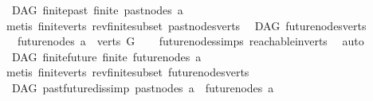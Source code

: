 \begin{isabellebody}
\isanewline
%
\endisadelimproof
\isanewline
{}\isamarkupfalse%
\ {\isacharparenleft}{\kern0pt}\ DAG{\isacharparenright}{\kern0pt}\ finite{\isacharunderscore}{\kern0pt}past{\isacharcolon}{\kern0pt}\ {\isachardoublequoteopen}finite\ {\isacharparenleft}{\kern0pt}past{\isacharunderscore}{\kern0pt}nodes\ a{\isacharparenright}{\kern0pt}{\isachardoublequoteclose}\isanewline
%
\isadelimproof
\ \ %
\endisadelimproof
%
\isatagproof
{}\isamarkupfalse%
\ {\isacharparenleft}{\kern0pt}metis\ finite{\isacharunderscore}{\kern0pt}verts\ rev{\isacharunderscore}{\kern0pt}finite{\isacharunderscore}{\kern0pt}subset\ past{\isacharunderscore}{\kern0pt}nodes{\isacharunderscore}{\kern0pt}verts{\isacharparenright}{\kern0pt}%
\endisatagproof
{\isafoldproof}%
%
\isadelimproof
\isanewline
%
\endisadelimproof
\isanewline
{}\isamarkupfalse%
\ {\isacharparenleft}{\kern0pt}\ DAG{\isacharparenright}{\kern0pt}\ future{\isacharunderscore}{\kern0pt}nodes{\isacharunderscore}{\kern0pt}verts{\isacharcolon}{\kern0pt}\ \isanewline
\ \ \ {\isachardoublequoteopen}future{\isacharunderscore}{\kern0pt}nodes\ a\ {\isasymsubseteq}\ verts\ G{\isachardoublequoteclose}\isanewline
%
\isadelimproof
\ \ %
\endisadelimproof
%
\isatagproof
{}\isamarkupfalse%
\ future{\isacharunderscore}{\kern0pt}nodes{\isachardot}{\kern0pt}simps\ reachable{}{\isacharunderscore}{\kern0pt}in{\isacharunderscore}{\kern0pt}verts\ \isamarkupfalse%
\ auto%
\endisatagproof
{\isafoldproof}%
%
\isadelimproof
\isanewline
%
\endisadelimproof
\isanewline
{}\isamarkupfalse%
\ {\isacharparenleft}{\kern0pt}\ DAG{\isacharparenright}{\kern0pt}\ finite{\isacharunderscore}{\kern0pt}future{\isacharcolon}{\kern0pt}\ {\isachardoublequoteopen}finite\ {\isacharparenleft}{\kern0pt}future{\isacharunderscore}{\kern0pt}nodes\ a{\isacharparenright}{\kern0pt}{\isachardoublequoteclose}\isanewline
%
\isadelimproof
\ \ %
\endisadelimproof
%
\isatagproof
{}\isamarkupfalse%
\ {\isacharparenleft}{\kern0pt}metis\ finite{\isacharunderscore}{\kern0pt}verts\ rev{\isacharunderscore}{\kern0pt}finite{\isacharunderscore}{\kern0pt}subset\ future{\isacharunderscore}{\kern0pt}nodes{\isacharunderscore}{\kern0pt}verts{\isacharparenright}{\kern0pt}%
\endisatagproof
{\isafoldproof}%
%
\isadelimproof
\isanewline
%
\endisadelimproof
\isanewline
{}\isamarkupfalse%
\ {\isacharparenleft}{\kern0pt}\ DAG{\isacharparenright}{\kern0pt}\ past{\isacharunderscore}{\kern0pt}future{\isacharunderscore}{\kern0pt}dis{\isacharbrackleft}{\kern0pt}simp{\isacharbrackright}{\kern0pt}{\isacharcolon}{\kern0pt}\ {\isachardoublequoteopen}past{\isacharunderscore}{\kern0pt}nodes\ a\ {\isasyminter}\ future{\isacharunderscore}{\kern0pt}nodes\ a\ {\isacharequal}{\kern0pt}\ {\isacharbraceleft}{\kern0pt}{\isacharbraceright}{\kern0pt}{\isachardoublequoteclose}\isanewline

\end{isabellebody}
